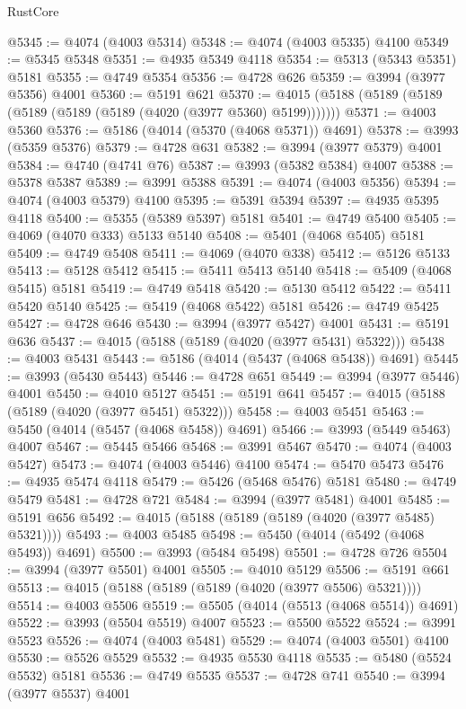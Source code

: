 \begin{lexlean}{RustCore}
\begin{coremodule}
@5345 := @4074 (@4003 @5314)
@5348 := @4074 (@4003 @5335) @4100
@5349 := @5345 @5348
@5351 := @4935 @5349 @4118
@5354 := @5313 (@5343 @5351) @5181
@5355 := @4749 @5354
@5356 := @4728 @626
@5359 := @3994 (@3977 @5356) @4001
@5360 := @5191 @621
@5370 := @4015 (@5188 (@5189 (@5189 (@5189 (@5189 (@5189 (@4020 (@3977 @5360) @5199)))))))
@5371 := @4003 @5360
@5376 := @5186 (@4014 (@5370 (@4068 @5371)) @4691)
@5378 := @3993 (@5359 @5376)
@5379 := @4728 @631
@5382 := @3994 (@3977 @5379) @4001
@5384 := @4740 (@4741 @76)
@5387 := @3993 (@5382 @5384) @4007
@5388 := @5378 @5387
@5389 := @3991 @5388
@5391 := @4074 (@4003 @5356)
@5394 := @4074 (@4003 @5379) @4100
@5395 := @5391 @5394
@5397 := @4935 @5395 @4118
@5400 := @5355 (@5389 @5397) @5181
@5401 := @4749 @5400
@5405 := @4069 (@4070 @333) @5133 @5140
@5408 := @5401 (@4068 @5405) @5181
@5409 := @4749 @5408
@5411 := @4069 (@4070 @338)
@5412 := @5126 @5133
@5413 := @5128 @5412
@5415 := @5411 @5413 @5140
@5418 := @5409 (@4068 @5415) @5181
@5419 := @4749 @5418
@5420 := @5130 @5412
@5422 := @5411 @5420 @5140
@5425 := @5419 (@4068 @5422) @5181
@5426 := @4749 @5425
@5427 := @4728 @646
@5430 := @3994 (@3977 @5427) @4001
@5431 := @5191 @636
@5437 := @4015 (@5188 (@5189 (@4020 (@3977 @5431) @5322)))
@5438 := @4003 @5431
@5443 := @5186 (@4014 (@5437 (@4068 @5438)) @4691)
@5445 := @3993 (@5430 @5443)
@5446 := @4728 @651
@5449 := @3994 (@3977 @5446) @4001
@5450 := @4010 @5127
@5451 := @5191 @641
@5457 := @4015 (@5188 (@5189 (@4020 (@3977 @5451) @5322)))
@5458 := @4003 @5451
@5463 := @5450 (@4014 (@5457 (@4068 @5458)) @4691)
@5466 := @3993 (@5449 @5463) @4007
@5467 := @5445 @5466
@5468 := @3991 @5467
@5470 := @4074 (@4003 @5427)
@5473 := @4074 (@4003 @5446) @4100
@5474 := @5470 @5473
@5476 := @4935 @5474 @4118
@5479 := @5426 (@5468 @5476) @5181
@5480 := @4749 @5479
@5481 := @4728 @721
@5484 := @3994 (@3977 @5481) @4001
@5485 := @5191 @656
@5492 := @4015 (@5188 (@5189 (@5189 (@4020 (@3977 @5485) @5321))))
@5493 := @4003 @5485
@5498 := @5450 (@4014 (@5492 (@4068 @5493)) @4691)
@5500 := @3993 (@5484 @5498)
@5501 := @4728 @726
@5504 := @3994 (@3977 @5501) @4001
@5505 := @4010 @5129
@5506 := @5191 @661
@5513 := @4015 (@5188 (@5189 (@5189 (@4020 (@3977 @5506) @5321))))
@5514 := @4003 @5506
@5519 := @5505 (@4014 (@5513 (@4068 @5514)) @4691)
@5522 := @3993 (@5504 @5519) @4007
@5523 := @5500 @5522
@5524 := @3991 @5523
@5526 := @4074 (@4003 @5481)
@5529 := @4074 (@4003 @5501) @4100
@5530 := @5526 @5529
@5532 := @4935 @5530 @4118
@5535 := @5480 (@5524 @5532) @5181
@5536 := @4749 @5535
@5537 := @4728 @741
@5540 := @3994 (@3977 @5537) @4001

\end{coremodule}
\end{lexlean}
